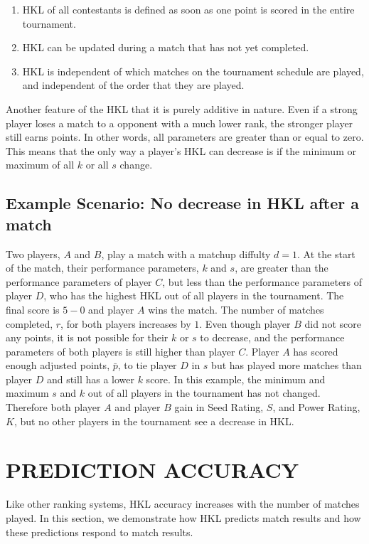 \documentclass[letterpaper, 10 pt, conference]{ieeeconf}  %
\begin{document}
\begin{enumerate}
        \item HKL of all contestants is defined as soon as one point is scored in the entire tournament.
        \item HKL can be updated during a match that has not yet completed.
        \item HKL is independent of which matches on the tournament schedule are played, and independent of the order that they are played.
\end{enumerate}

Another feature of the HKL that it is purely additive in nature.
Even if a strong player loses a match to a opponent with a much lower rank, the stronger player still earns points. 
In other words, all parameters are greater than or equal to zero.
This means that the only way a player's HKL can decrease is if the minimum or maximum of all $k$ or all $s$ change. 

\subsection{Example Scenario: No decrease in HKL after a match}
Two players, $A$ and $B$, play a match with a matchup diffulty $d=1$.
At the start of the match, their performance parameters, $k$ and $s$, are greater than the performance parameters of player $C$, but less than the performance parameters of player $D$, who has the highest HKL out of all players in the tournament.
The final score is $5-0$ and player $A$ wins the match.
The number of matches completed, $r$, for both players increases by $1$.
Even though player $B$ did not score any points, it is not possible for their $k$ or $s$ to decrease, and the performance parameters of both players is still higher than player $C$.
Player $A$ has scored enough adjusted points, $\bar{p}$, to tie player $D$ in $s$ but has played more matches than player $D$ and still has a lower $k$ score.
In this example, the minimum and maximum $s$ and $k$ out of all players in the tournament has not changed. 
Therefore both player $A$ and player $B$ gain in Seed Rating, $S$, and Power Rating, $K$, but no other players in the tournament see a decrease in HKL.

\section{PREDICTION ACCURACY}
Like other ranking systems, HKL accuracy increases with the number of matches played.
In this section, we demonstrate how HKL predicts match results and how these predictions respond to match results.
\end{document}
